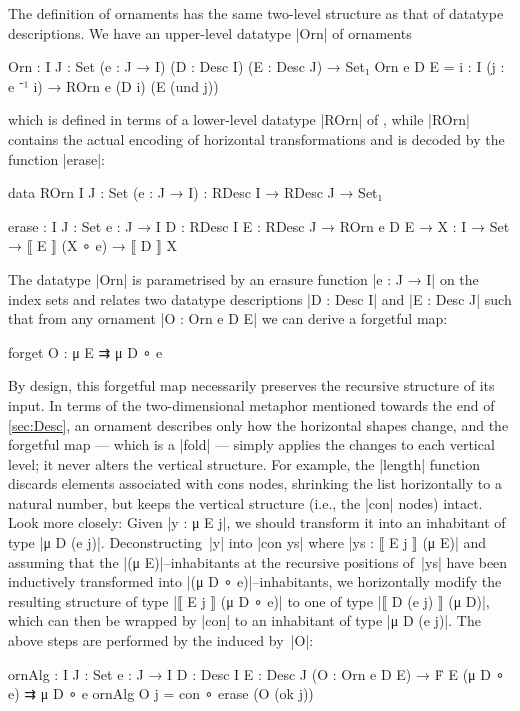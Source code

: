 The definition of ornaments has the same two-level structure as that of datatype descriptions.
We have an upper-level datatype |Orn| of ornaments
\begin{code}
Orn : {I J : Set} (e : J → I) (D : Desc I) (E : Desc J) → Set₁
Orn e D E = {i : I} (j : e ⁻¹ i) → ROrn e (D i) (E (und j))
\end{code}
which is defined in terms of a lower-level datatype |ROrn| of , while |ROrn| contains the actual encoding of horizontal transformations and is decoded by the function |erase|:
\begin{code}
data ROrn {I J : Set} (e : J → I) : RDesc I → RDesc J → Set₁
           
erase :  {I J : Set} {e : J → I} {D : RDesc I} {E : RDesc J} →
         ROrn e D E → {X : I → Set} → ⟦ E ⟧ (X ∘ e) → ⟦ D ⟧ X
\end{code}
The datatype |Orn| is parametrised by an erasure function |e : J → I| on the index sets and relates two datatype descriptions |D : Desc I| and |E : Desc J| such that from any ornament |O : Orn e D E| we can derive a forgetful map:
\begin{spec}
forget O : μ E ⇉ μ D ∘ e
\end{spec}
By design, this forgetful map necessarily preserves the recursive structure of its input.
In terms of the two-dimensional metaphor mentioned towards the end of \autoref{sec:Desc}, an ornament describes only how the horizontal shapes change, and the forgetful map --- which is a |fold| --- simply applies the changes to each vertical level; it never alters the vertical structure.
For example, the |length| function discards elements associated with cons nodes, shrinking the list horizontally to a natural number, but keeps the vertical structure (i.e., the |con| nodes) intact.
Look more closely:
Given |y : μ E j|, we should transform it into an inhabitant of type |μ D (e j)|.
Deconstructing~|y| into |con ys| where |ys : ⟦ E j ⟧ (μ E)| and assuming that the |(μ E)|--inhabitants at the recursive positions of~|ys| have been inductively transformed into |(μ D ∘ e)|--inhabitants, we horizontally modify the resulting structure of type |⟦ E j ⟧ (μ D ∘ e)| to one of type |⟦ D (e j) ⟧ (μ D)|, which can then be wrapped by |con| to an inhabitant of type |μ D (e j)|.
The above steps are performed by the  induced by~|O|:
\begin{code}
ornAlg :  {I J : Set} {e : J → I} {D : Desc I} {E : Desc J}
          (O : Orn e D E) → Ḟ E (μ D ∘ e) ⇉ μ D ∘ e
ornAlg O {j} = con ∘ erase (O (ok j))
\end{code}
